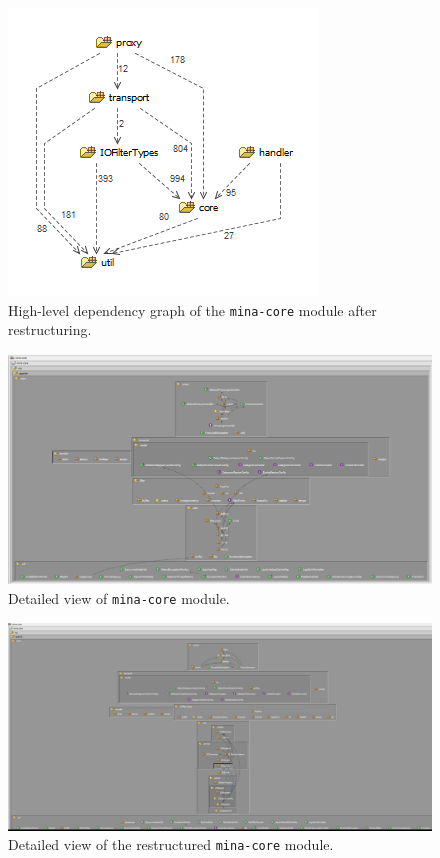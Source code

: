 \begin{figure}[H]
    \centering
    \includegraphics{images/MINA_core_dependencies_restructure.png}
    \caption{High-level dependency graph of the \texttt{mina-core} module after restructuring.}
    \label{fig:mina_core_dependencies_restructured}
\end{figure}

\begin{landscape}
\begin{figure}
    \centering
    \includegraphics[width=\linewidth]{images/MINA_core_extended_initial.png}
    \caption{Detailed view of \texttt{mina-core} module.}
    \label{fig:mina_core_initial_detailed}
\end{figure}
\end{landscape}

\begin{landscape}
\begin{figure}
    \centering
    \includegraphics[scale=0.4]{images/MINA_core_extended_restructured.png}
    \caption{Detailed view of the restructured \texttt{mina-core} module.}
\end{figure}
\end{landscape}

